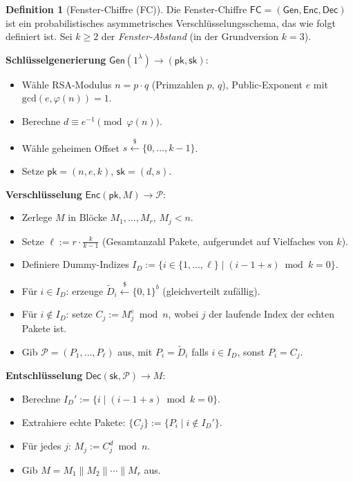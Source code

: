 ﻿\documentclass[12pt, a4paper]{article}
\theoremstyle{plain}
\theoremstyle{definition}
\newtheorem{definition}[theorem]{Definition}
\theoremstyle{remark}
\newcommand{\FC}{\mathsf{FC}}
\newcommand{\pk}{\mathsf{pk}}
\newcommand{\sk}{\mathsf{sk}}
\newcommand{\Enc}{\mathsf{Enc}}
\newcommand{\Dec}{\mathsf{Dec}}
\newcommand{\Gen}{\mathsf{Gen}}
\newcommand{\GCD}{\mathrm{gcd}}
\begin{document}
\begin{definition}[Fenster-Chiffre (FC)]\label{def:fc_protokoll}
  Die Fenster-Chiffre $\FC = (\Gen, \Enc, \Dec)$ ist ein probabilistisches
  asymmetrisches Verschl\"usselungsschema, das wie folgt definiert ist.
  Sei $k \geq 2$ der \emph{Fenster-Abstand} (in der Grundversion $k=3$).

  \medskip
  \noindent\textbf{Schl\"usselgenerierung} $\Gen(1^\lambda) \to (\pk, \sk)$:
  \begin{itemize}
    \item W\"ahle RSA-Modulus $n = p\cdot q$ (Primzahlen $p,\,q$),
          Public-Exponent $e$ mit $\GCD(e,\varphi(n))=1$.
    \item Berechne $d \equiv e^{-1} \pmod{\varphi(n)}$.
    \item W\"ahle geheimen Offset $s \xleftarrow{\$} \{0,\ldots,k-1\}$.
    \item Setze $\pk = (n, e, k)$, $\sk = (d, s)$.
  \end{itemize}

  \medskip
  \noindent\textbf{Verschl\"usselung} $\Enc(\pk, M) \to \mathcal{P}$:
  \begin{itemize}
    \item Zerlege $M$ in Bl\"ocke $M_1,\ldots,M_r$, $M_j < n$.
    \item Setze $\ell := r \cdot \frac{k}{k-1}$ (Gesamtanzahl Pakete,
          aufgerundet auf Vielfaches von $k$).
    \item Definiere Dummy-Indizes $I_D := \{i \in \{1,\ldots,\ell\} \mid (i-1+s) \bmod k = 0\}$.
    \item F\"ur $i \in I_D$: erzeuge $\tilde{D}_i \xleftarrow{\$} \{0,1\}^b$
          (gleichverteilt zuf\"allig).
    \item F\"ur $i \notin I_D$: setze $C_j := M_j^e \bmod n$, wobei $j$ der
          laufende Index der echten Pakete ist.
    \item Gib $\mathcal{P} = (P_1,\ldots,P_\ell)$ aus, mit
          $P_i = \tilde{D}_i$ falls $i \in I_D$, sonst $P_i = C_j$.
  \end{itemize}

  \medskip
  \noindent\textbf{Entschl\"usselung} $\Dec(\sk, \mathcal{P}) \to M$:
  \begin{itemize}
    \item Berechne $I_D' := \{i \mid (i-1+s) \bmod k = 0\}$.
    \item Extrahiere echte Pakete: $\{C_j\} := \{P_i \mid i \notin I_D'\}$.
    \item F\"ur jedes $j$: $M_j := C_j^d \bmod n$.
    \item Gib $M = M_1 \| M_2 \| \cdots \| M_r$ aus.
  \end{itemize}
\end{definition}
\end{document}
